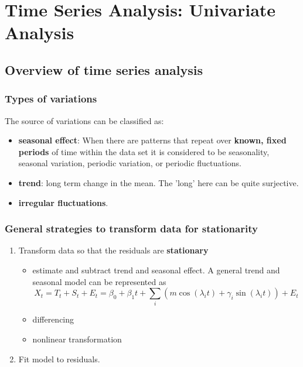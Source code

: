 \startcontents[chapters]
\chapter{Time Series Analysis: Univariate Analysis}\label{ch:time-series-analysis}
	
\section{Overview of time series analysis}
\subsection{Types of variations}
The source of variations can be classified as: \cite[10]{chatfield2003analysis}
\begin{itemize}
    \item \textbf{seasonal effect}:\cite{wiki:seasonality} When there are patterns that repeat over \textbf{known, fixed periods} of time within the data set it is considered to be seasonality, seasonal variation, periodic variation, or periodic fluctuations. 
    \item \textbf{trend}: long term change in the mean. The 'long' here can be quite surjective.
    \item \textbf{irregular fluctuations}.
\end{itemize}


\subsection{General strategies to transform data for stationarity}
\begin{mdframed}
\begin{enumerate}
\item Transform data so that the residuals are \textbf{stationary}
\begin{itemize}
    \item estimate and subtract trend and seasonal effect. A general trend and seasonal model can be represented as
    $$X_t = T_t + S_t + E_t = \beta_0 + \beta_1 t + \sum_i (m \cos(\lambda_i t) + \gamma_i \sin(\lambda_i t)) + E_t$$
    \item differencing
    \item nonlinear transformation
\end{itemize}
\item Fit model to residuals.
\end{enumerate}
\end{mdframed}


